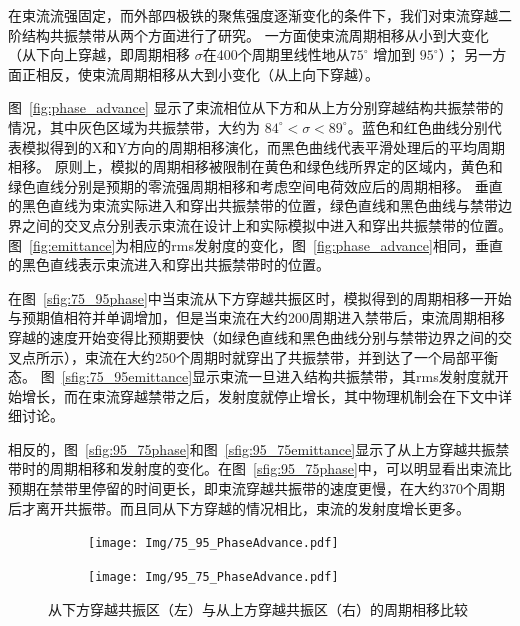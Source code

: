 在束流流强固定，而外部四极铁的聚焦强度逐渐变化的条件下，我们对束流穿越二阶结构共振禁带从两个方面进行了研究。
一方面使束流周期相移从小到大变化（从下向上穿越，即周期相移 $\sigma$在400个周期里线性地从$75^{\circ}$ 增加到 $95^{\circ}$）；
另一方面正相反，使束流周期相移从大到小变化（从上向下穿越）。

图~\eqref{fig:phase_advance} 显示了束流相位从下方和从上方分别穿越结构共振禁带的情况，其中灰色区域为共振禁带，大约为 $84^ {\circ}<\sigma<89^{\circ}$。蓝色和红色曲线分别代表模拟得到的X和Y方向的周期相移演化，而黑色曲线代表平滑处理后的平均周期相移。
原则上，模拟的周期相移被限制在黄色和绿色线所界定的区域内，黄色和绿色直线分别是预期的零流强周期相移和考虑空间电荷效应后的周期相移。
垂直的黑色直线为束流实际进入和穿出共振禁带的位置，绿色直线和黑色曲线与禁带边界之间的交叉点分别表示束流在设计上和实际模拟中进入和穿出共振禁带的位置。
图~\eqref{fig:emittance}为相应的rms发射度的变化，图~\eqref{fig:phase_advance}相同，垂直的黑色直线表示束流进入和穿出共振禁带时的位置。

在图~\eqref{sfig:75_95phase}中当束流从下方穿越共振区时，模拟得到的周期相移一开始与预期值相符并单调增加，但是当束流在大约200周期进入禁带后，束流周期相移穿越的速度开始变得比预期要快（如绿色直线和黑色曲线分别与禁带边界之间的交叉点所示），束流在大约250个周期时就穿出了共振禁带，并到达了一个局部平衡态。
图~\eqref{sfig:75_95emittance}显示束流一旦进入结构共振禁带，其rms发射度就开始增长，而在束流穿越禁带之后，发射度就停止增长，其中物理机制会在下文中详细讨论。

相反的，图~\eqref{sfig:95_75phase}和图~\eqref{sfig:95_75emittance}显示了从上方穿越共振禁带时的周期相移和发射度的变化。在图~\eqref{sfig:95_75phase}中，可以明显看出束流比预期在禁带里停留的时间更长，即束流穿越共振带的速度更慢，在大约370个周期后才离开共振带。而且同从下方穿越的情况相比，束流的发射度增长更多。

\begin{figure}[thbp]
    \centering
    \begin{subfigure}[b]{0.48\textwidth}
        \centering
        \texttt{[image: Img/75\_95\_PhaseAdvance.pdf]}
        \caption{}
        \label{sfig:75_95phase}
    \end{subfigure}
    \begin{subfigure}[b]{0.48\textwidth}
        \centering
        \texttt{[image: Img/95\_75\_PhaseAdvance.pdf]}
        \caption{}
        \label{sfig:95_75phase}
    \end{subfigure}
    \caption{从下方穿越共振区（左）与从上方穿越共振区（右）的周期相移比较}
    \label{fig:phase_advance}
\end{figure}

